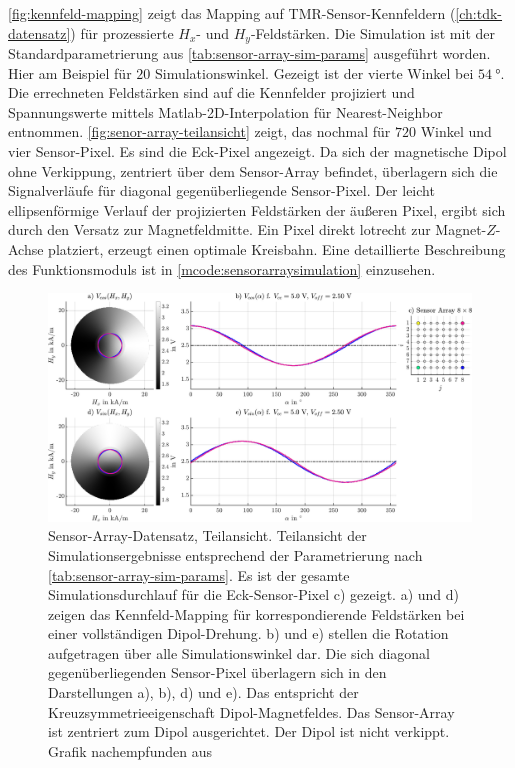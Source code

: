 \autoref{fig:kennfeld-mapping} zeigt das Mapping auf TMR-Sensor-Kennfeldern (\autoref{ch:tdk-datensatz}) für prozessierte $H_x$- und $H_y$-Feldstärken. Die Simulation ist mit der Standardparametrierung aus \autoref{tab:sensor-array-sim-params} ausgeführt worden. Hier am Beispiel für $20$ Simulationswinkel. Gezeigt ist der vierte Winkel bei $\SI{54}{\degree}$. Die errechneten Feldstärken sind auf die Kennfelder projiziert und Spannungswerte mittels Matlab-2D-Interpolation für Nearest-Neighbor entnommen. \autoref{fig:senor-array-teilansicht} zeigt, das nochmal für $720$ Winkel und vier Sensor-Pixel. Es sind die Eck-Pixel angezeigt. Da sich der magnetische Dipol ohne Verkippung, zentriert über dem Sensor-Array befindet, überlagern sich die Signalverläufe für diagonal gegenüberliegende Sensor-Pixel. Der leicht ellipsenförmige Verlauf der projizierten Feldstärken der äußeren Pixel, ergibt sich durch den Versatz zur Magnetfeldmitte. Ein Pixel direkt lotrecht zur Magnet-$Z$-Achse platziert, erzeugt einen optimale Kreisbahn. Eine detaillierte Beschreibung des Funktionsmoduls ist in \autoref{mcode:sensorarraysimulation} einzusehen.


\vspace{4mm}
\begin{figure}[bph]
	\centering
	\includegraphics[width=\linewidth]{appendix/images/5-Sensor-Array-Sim-Imp/Senor-Array-Teilansicht}
	\caption[Sensor-Array-Datensatz, Teilansicht]{Sensor-Array-Datensatz, Teilansicht. Teilansicht der Simulationsergebnisse entsprechend der Parametrierung nach \autoref{tab:sensor-array-sim-params}. Es ist der gesamte Simulationsdurchlauf für die Eck-Sensor-Pixel c) gezeigt. a) und d) zeigen das Kennfeld-Mapping für korrespondierende Feldstärken bei einer vollständigen Dipol-Drehung. b) und e) stellen die Rotation aufgetragen über alle Simulationswinkel dar. Die sich diagonal gegenüberliegenden Sensor-Pixel überlagern sich in den Darstellungen a), b), d) und e). Das entspricht der Kreuzsymmetrieeigenschaft Dipol-Magnetfeldes. Das Sensor-Array ist zentriert zum Dipol ausgerichtet. Der Dipol ist nicht verkippt. Grafik nachempfunden aus \cite{Schuethe2019}}
	\label{fig:senor-array-teilansicht}
\end{figure}
